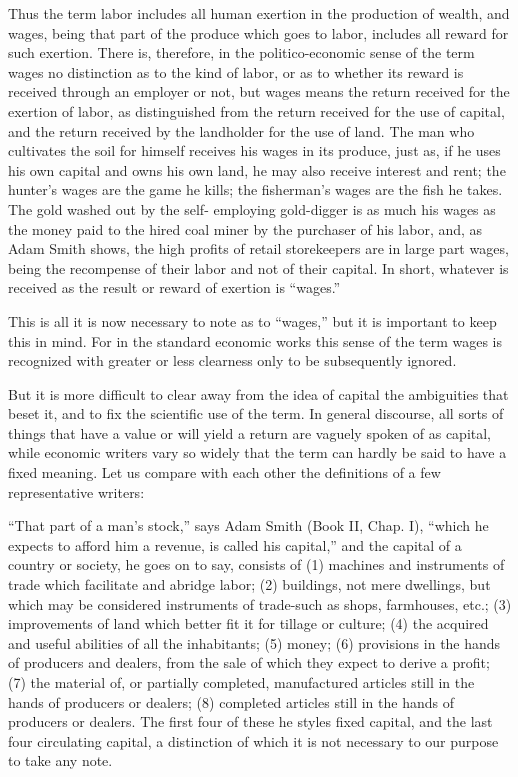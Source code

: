 Thus the term labor includes all human exertion in the production of
wealth, and wages, being that part of the produce which goes to labor,
includes all reward for such exertion. There is, therefore, in the
politico-economic sense of the term wages no distinction as to the kind
of labor, or as to whether its reward is received through an employer or
not, but wages means the return received for the exertion of labor, as
distinguished from the return received for the use of capital, and the
return received by the landholder for the use of land. The man who
cultivates the soil for himself receives his wages in its produce, just
as, if he uses his own capital and owns his own land, he may also
receive interest and rent; the hunter's wages are the game he kills; the
fisherman's wages are the fish he takes. The gold washed out by the
self- employing gold-digger is as much his wages as the money paid to
the hired coal miner by the purchaser of his labor, and, as Adam Smith
shows, the high profits of retail storekeepers are in large part wages,
being the recompense of their labor and not of their capital. In short,
whatever is received as the result or reward of exertion is ``wages.''

This is all it is now necessary to note as to ``wages,'' but it is
important to keep this in mind. For in the standard economic works this
sense of the term wages is recognized with greater or less clearness
only to be subsequently ignored.

But it is more difficult to clear away from the idea of capital the
ambiguities that beset it, and to fix the scientific use of the term. In
general discourse, all sorts of things that have a value or will yield a
return are vaguely spoken of as capital, while economic writers vary so
widely that the term can hardly be said to have a fixed meaning. Let us
compare with each other the definitions of a few representative writers:

``That part of a man's stock,'' says Adam Smith (Book II, Chap. I),
``which he expects to afford him a revenue, is called his capital,'' and
the capital of a country or society, he goes on to say, consists of (1)
machines and instruments of trade which facilitate and abridge labor;
(2) buildings, not mere dwellings, but which may be considered
instruments of trade-such as shops, farmhouses, etc.; (3) improvements
of land which better fit it for tillage or culture; (4) the acquired and
useful abilities of all the inhabitants; (5) money; (6) provisions in
the hands of producers and dealers, from the sale of which they expect
to derive a profit; (7) the material of, or partially completed,
manufactured articles still in the hands of producers or dealers; (8)
completed articles still in the hands of producers or dealers. The first
four of these he styles fixed capital, and the last four circulating
capital, a distinction of which it is not necessary to our purpose to
take any note.

